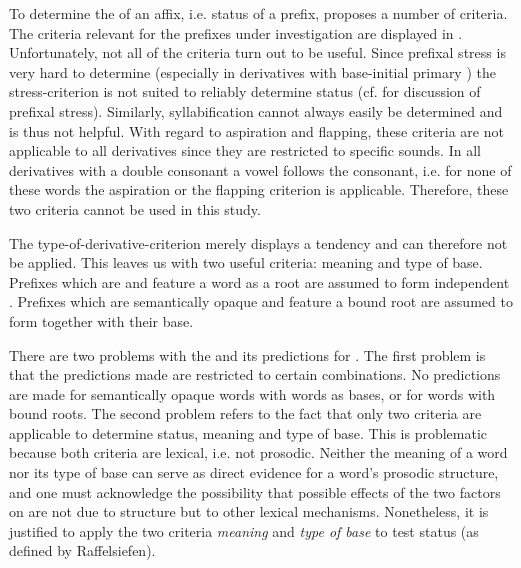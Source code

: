 To determine the  of an affix, i.e.  status of a prefix, \cite{Raffelsiefen.1999} proposes a number of criteria. The criteria relevant for the prefixes under investigation are displayed in . Unfortunately, not all of the criteria turn out to be useful. Since {prefixal stress} is very hard to determine (especially in derivatives with base-initial primary ) the stress-criterion is not suited to reliably determine  status (cf.  for discussion of {prefixal stress}). Similarly, syllabification cannot always easily be determined and is thus not helpful. 
With regard to aspiration and flapping, these criteria are not applicable to all derivatives since they are restricted to specific sounds. In all derivatives with a double consonant a vowel follows the consonant, i.e. for none of these words the aspiration or the flapping criterion is applicable. Therefore, these two criteria cannot be used in this study.

The type-of-derivative-criterion merely displays a tendency and can therefore not be applied. 
This leaves us with two useful criteria: meaning and type of base. Prefixes which are  and feature a word as a root are assumed to form independent . Prefixes which are semantically opaque and feature a bound root are assumed to form  together with their base. 

There are two problems with the  and its predictions for . 
The first problem is that the predictions made are restricted to certain combinations. No predictions are made for semantically opaque words with words as bases, or for  words with bound roots. 
The second problem refers to the fact that only two criteria are applicable to determine  status, meaning and type of base. This is problematic because both criteria are lexical, i.e. not prosodic. Neither the meaning of a word nor its type of base can serve as direct evidence for a word's prosodic structure, and one must acknowledge the possibility that possible effects of the two factors on  are not due to  structure but to other lexical mechanisms. 
Nonetheless, it is justified to apply the two criteria \textit{meaning} and \textit{type of base} to test  status (as defined by Raffelsiefen). 

